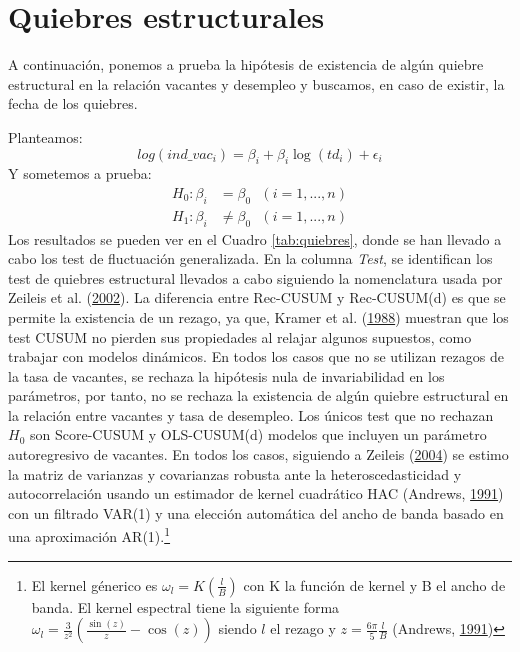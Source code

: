 \documentclass[12pt,oneside]{reedthesis}
\begin{document}
\hypertarget{quiebres-estructurales-1}{%
\section{Quiebres estructurales}\label{quiebres-estructurales-1}}

A continuación, ponemos a prueba la hipótesis de existencia de algún quiebre estructural en la relación vacantes y desempleo y buscamos, en caso de existir, la fecha de los quiebres.

Planteamos:
\begin{equation}
log(ind\_vac_i) = \beta_i + \beta_i\log(td_i) + \epsilon_i
\end{equation}
Y sometemos a prueba:
\begin{align}
H_0: \beta_i &= \beta_0 \ \ \ (i = 1, ..., n) \\
H_1: \beta_i &\not= \beta_0 \ \ \ (i = 1, ..., n)
\end{align}
Los resultados se pueden ver en el Cuadro \ref{tab:quiebres}, donde se han llevado a cabo los test de fluctuación generalizada. En la columna \emph{Test}, se identifican los test de quiebres estructural llevados a cabo siguiendo la nomenclatura usada por Zeileis et al. (\protect\hyperlink{ref-Zeileis2002}{2002}). La diferencia entre Rec-CUSUM y Rec-CUSUM(d) es que se permite la existencia de un rezago, ya que, Kramer et al. (\protect\hyperlink{ref-Society1988}{1988}) muestran que los test CUSUM no pierden sus propiedades al relajar algunos supuestos, como trabajar con modelos dinámicos. En todos los casos que no se utilizan rezagos de la tasa de vacantes, se rechaza la hipótesis nula de invariabilidad en los parámetros, por tanto, no se rechaza la existencia de algún quiebre estructural en la relación entre vacantes y tasa de desempleo. Los únicos test que no rechazan \(H_0\) son Score-CUSUM y OLS-CUSUM(d) modelos que incluyen un parámetro autoregresivo de vacantes. En todos los casos, siguiendo a Zeileis (\protect\hyperlink{ref-Zeileis2004}{2004}) se estimo la matriz de varianzas y covarianzas robusta ante la heteroscedasticidad y autocorrelación usando un estimador de kernel cuadrático HAC (Andrews, \protect\hyperlink{ref-Andrews1991}{1991}) con un filtrado VAR(1) y una elección automática del ancho de banda basado en una aproximación AR(1).\footnote{El kernel génerico es \(\omega_l = K(\frac{l}{B})\) con K la función de kernel y B el ancho de banda. El kernel espectral tiene la siguiente forma \(\omega_l = \frac{3}{z^2}(\frac{\sin(z)}{z} - \cos(z))\) siendo \(l\) el rezago y \(z = \frac{6\pi}{5}\frac{l}{B}\) (Andrews, \protect\hyperlink{ref-Andrews1991}{1991})}
\end{document}
